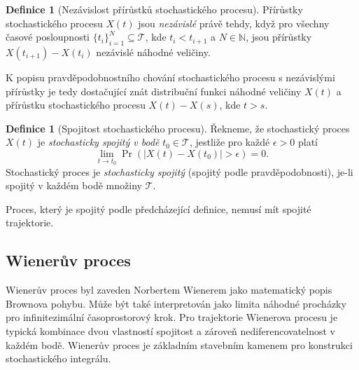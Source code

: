\documentclass[a4paper,12pt]{report}
\theoremstyle{definition} \newtheorem{definice}[veta]{Definice}
\theoremstyle{remark}
\begin{document}
\begin{definice}[Nezávislost přírůstků stochastického procesu]
Přírůstky stochastického procesu $X(t)$ jsou \textit{nezávislé} právě tehdy, když pro všechny časové posloupnosti $\{t_i\}_{i=1}^N\subseteq\mathcal{T}$, kde $t_i<t_{i+1}$ a $N\in\mathbb{N}$, jsou přírůstky $X(t_{i+1})-X(t_i)$ nezávislé náhodné veličiny.
\end{definice}
K popisu pravděpodobnostního chování stochastického procesu s nezávislými přírůstky je tedy dostačující znát distribuční funkci náhodné veličiny $X(t)$ a přírůstku stochastického procesu $X(t)-X(s)$, %
kde $t>s$.

\begin{definice}[Spojitost stochastického procesu]
Řekneme, že stochastický proces $X(t)$ je \textit{stochasticky spojitý v bodě} $t_0\in\mathcal{T}$, jestliže pro každé $\epsilon>0$ platí
$$\lim_{t\to t_0}\Pr(|X(t)-X(t_0)|>\epsilon)=0.$$
Stochastický proces je  \textit{stochasticky spojitý} (spojitý podle pravděpodobnosti), je-li spojitý v každém bodě množiny $\mathcal{T}$.
\end{definice}
Proces, který je spojitý podle předcházející definice, nemusí mít spojité trajektorie.


\subsection{Wienerův proces}\label{WP_kap}
Wienerův proces byl zaveden Norbertem Wienerem jako matematický popis Brownova pohybu.
Může být také interpretován jako limita náhodné procházky pro infinitezimální časoprostorový krok.
Pro trajektorie Wienerova procesu je typická kombinace dvou vlastností spojitost a zároveň nediferencovatelnost v každém bodě.
Wienerův proces je základním stavebním kamenem pro konstrukci stochastického integrálu.
\end{document}
